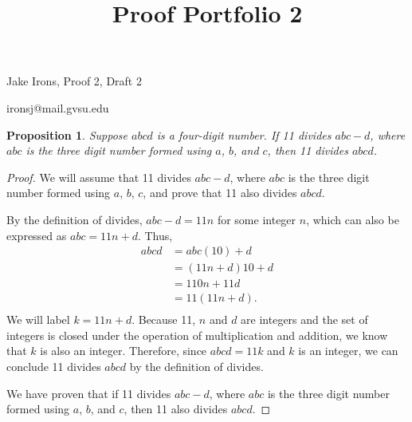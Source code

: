 \documentclass[11 pt]{article}
\title{Proof Portfolio 2}
\newtheorem{proposition}{Proposition}
\newcommand{\newpar}{\vspace{.15in}\noindent}
\begin{document}
\noindent Jake Irons, Proof 2, Draft 2

\noindent ironsj@mail.gvsu.edu

\newpar
\begin{proposition}
Suppose $abcd$ is a four-digit number. If 11 divides $abc-d$, where $abc$ is the three digit number formed using $a$, $b$, and $c$, then 11 divides $abcd$.
\end{proposition}
\begin{proof}
We will assume that 11 divides $abc-d$, where $abc$ is the three digit number formed using $a$, $b$, $c$, and prove that 11 also divides $abcd$.

\newpar
By the definition of divides, $abc-d=11n$ for some integer $n$, which can also be expressed as $abc=11n+d$. Thus, 
\begin{align*}
abcd&=abc(10)+d \\
&= (11n+d)10+d \\
&= 110n+11d \\
&= 11(11n+d). \\
\end{align*}
\noindent
We will label $k=11n+d$. Because 11, $n$ and $d$ are integers and the set of integers is closed under the operation of multiplication and addition, we know that $k$ is also an integer. Therefore, since
$abcd=11k$ and $k$ is an integer, we can conclude 11 divides $abcd$ by the definition of divides.

\newpar
We have proven that if 11 divides $abc-d$, where $abc$ is the three digit number formed using $a$, $b$, and $c$, then 11 also divides $abcd$.
\end{proof}
\end{document}
